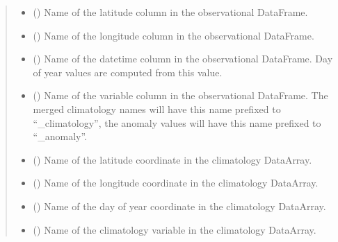 \documentclass[letterpaper,10pt,english]{sphinxmanual}
\begin{document}
\begin{fulllineitems}
\begin{quote}
\begin{description}
\begin{itemize}
\item {}
\sphinxAtStartPar
{} () \textendash{} Name of the latitude column in the observational DataFrame.

\item {}
\sphinxAtStartPar
{} () \textendash{} Name of the longitude column in the observational DataFrame.

\item {}
\sphinxAtStartPar
{} () \textendash{} Name of the datetime column in the observational DataFrame. Day of year
values are computed from this value.

\item {}
\sphinxAtStartPar
{} () \textendash{} Name of the variable column in the observational DataFrame. The merged
climatology names will have this name prefixed to “\_climatology”, the
anomaly values will have this name prefixed to “\_anomaly”.

\item {}
\sphinxAtStartPar
{} () \textendash{} Name of the latitude coordinate in the climatology DataArray.

\item {}
\sphinxAtStartPar
{} () \textendash{} Name of the longitude coordinate in the climatology DataArray.

\item {}
\sphinxAtStartPar
{} () \textendash{} Name of the day of year coordinate in the climatology DataArray.

\item {}
\sphinxAtStartPar
{} () \textendash{} Name of the climatology variable in the climatology DataArray.


\end{itemize}
\end{description}
\end{quote}
\end{fulllineitems}
\end{document}
